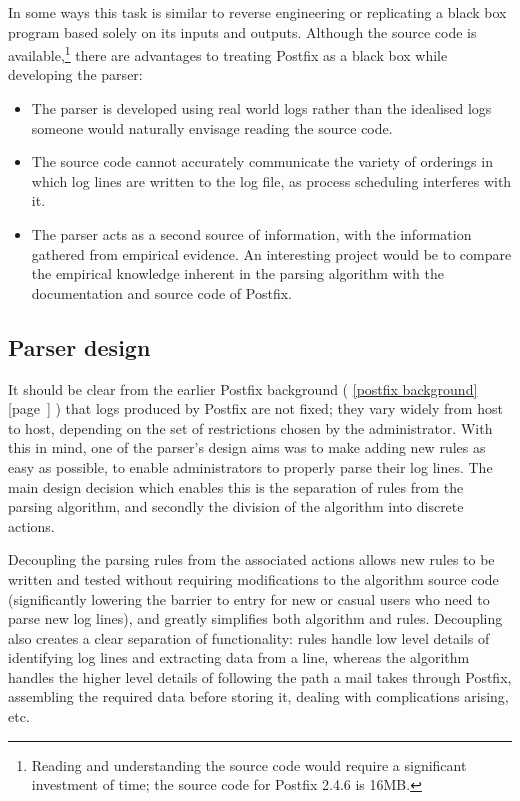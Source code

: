 \documentclass[a4paper,12pt,draft]{article}
\newcommand{\refwithpage}[1]{%
    \empty{}\ref{#1} [page~\pageref{#1}]%
}
\newcommand{\sectionref}[1]{%
    \textsection{}\refwithpage{#1}%
}
\begin{document}
In some ways this task is similar to reverse engineering or replicating a
black box program based solely on its inputs and outputs.  Although the
source code is available,\footnote{Reading and understanding the source
code would require a significant investment of time; the source code for
Postfix 2.4.6 is 16MB.} there are advantages to treating Postfix as a black
box while developing the parser:

\begin{itemize}

    \item The parser is developed using real world logs rather than the
        idealised logs someone would naturally envisage reading the source
        code.

    \item The source code cannot accurately communicate the variety of
        orderings in which log lines are written to the log file, as
        process scheduling interferes with it.

    \item The parser acts as a second source of information, with the
        information gathered from empirical evidence.  An interesting
        project would be to compare the empirical knowledge inherent in the
        parsing algorithm with the documentation and source code of
        Postfix.

\end{itemize}


\subsection{Parser design}

\label{parser design}

It should be clear from the earlier Postfix background (\sectionref{postfix
background}) that logs produced by Postfix are not fixed; they vary widely
from host to host, depending on the set of restrictions chosen by the
administrator.  With this in mind, one of the parser's design aims was to
make adding new rules as easy as possible, to enable administrators to
properly parse their log lines.  The main design decision which enables
this is the separation of rules from the parsing algorithm, and secondly
the division of the algorithm into discrete actions.

\label{why separate rules and algorithm}

Decoupling the parsing rules from the associated actions allows new rules
to be written and tested without requiring modifications to the algorithm
source code (significantly lowering the barrier to entry for new or casual
users who need to parse new log lines), and greatly simplifies both
algorithm and rules.  Decoupling also creates a clear separation of
functionality: rules handle low level details of identifying log lines and
extracting data from a line, whereas the algorithm handles the higher level
details of following the path a mail takes through Postfix, assembling the
required data before storing it, dealing with complications arising, etc.
\end{document}
